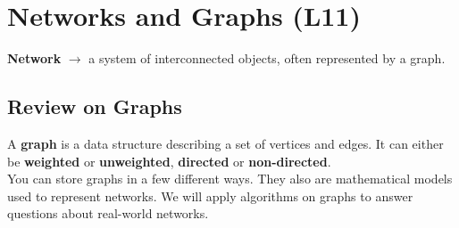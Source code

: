 \documentclass[english, 10pt]{article}
\begin{document}
\section{Networks and Graphs (L11)}

\begin{tcolorbox}[title=Definition:,colframe=red!75!black,colback=red!5!white,arc=0pt,fonttitle=\bfseries]
\textbf{Network} $\rightarrow$ a system of interconnected objects, often represented by a graph.
\end{tcolorbox}

\subsection{Review on Graphs}

A \textbf{graph} is a data structure describing a set of vertices and edges. It can either be \textbf{weighted} or \textbf{unweighted}, \textbf{directed} or \textbf{non-directed}.\\

You can store graphs in a few different ways. They also are mathematical models used to represent networks. We will apply algorithms on graphs to answer questions about real-world networks. \\
\end{document}
